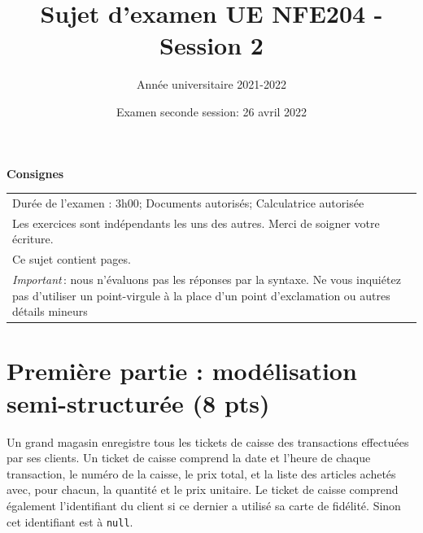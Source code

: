 \documentclass[11pt,a4paper]{article}
\begin{document}
\title{Sujet d'examen UE NFE204 - Session 2}
\author{Année universitaire 2021-2022}
\date{Examen seconde session: 26 avril  2022}

\maketitle

\begin{center}
{\bf \Large Consignes}\\
\begin{tabular}{| p{15cm} |}
\hline
Dur\'ee de l'examen : 3h00; Documents autoris\'es;  Calculatrice autoris\'ee\\

Les exercices sont indépendants les uns des autres. Merci de soigner votre écriture.\\
Ce sujet contient \pageref{LastPage} pages.\\

\textit{Important}\,: nous n'évaluons pas les réponses par la syntaxe. Ne vous
inquiétez pas d'utiliser un point-virgule à la place d'un point d'exclamation ou
autres détails mineurs
\\
\hline
\end{tabular}
\end{center}


\section*{Première partie : modélisation semi-structurée (8 pts)}

Un grand magasin enregistre tous les tickets de caisse des transactions effectuées par ses clients.
Un ticket de caisse comprend la date et l'heure de chaque transaction, le numéro de la caisse, le prix total,
et la liste des articles achetés avec, pour chacun, la quantité et le prix unitaire.  Le ticket de caisse comprend également
l'identifiant du client si ce dernier a utilisé sa carte de fidélité. Sinon cet identifiant
est à \texttt{null}.
\end{document}
